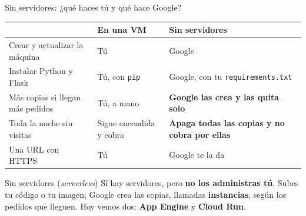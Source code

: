 \documentclass[aspectratio=169,10pt,c]{beamer}
\begin{document}
\begin{frame}{Sin servidores: ¿qué haces tú y qué hace Google?}
\renewcommand{\arraystretch}{1.25}
\small
\begin{center}
\begin{tabular}{@{}>{\raggedright\arraybackslash}p{4.3cm}>{\raggedright\arraybackslash}p{3.9cm}>{\raggedright\arraybackslash}p{4.4cm}@{}}
\toprule
 & \textbf{En una VM} & \textbf{Sin servidores}\\
\midrule
Crear y actualizar la máquina & Tú & Google\\
Instalar Python y Flask & Tú, con \texttt{pip} & Google, con tu \texttt{requirements.txt}\\
Más copias si llegan más pedidos & Tú, a mano & \textcolor{okVerde}{\textbf{Google las crea y las quita solo}}\\
Toda la noche sin visitas & Sigue encendida y cobra & \textcolor{okVerde}{\textbf{Apaga todas las copias y no cobra por ellas}}\\
Una URL con HTTPS & Tú & Google te la da\\
\bottomrule
\end{tabular}
\end{center}
\vspace{2mm}
\begin{block}{Sin servidores (\textit{serverless})}
\small Sí hay servidores, pero \textbf{no los administras tú}. Subes tu código o tu imagen; Google crea las copias, llamadas \textbf{instancias}, según los pedidos que lleguen. Hoy vemos dos: \textbf{App Engine} y \textbf{Cloud Run}.
\end{block}
\end{frame}
\end{document}
